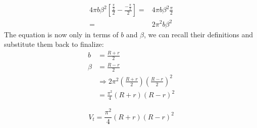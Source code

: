 \documentclass{article}
\begin{document}
	\begin{align*}
			4\pi b \beta^2\left[\frac{\frac{\pi}{2}}{2}-\frac{-\frac{\pi}{2}}{2}\right]=&4\pi b \beta^2\frac{\pi}{2} \\
			=&2\pi^2 b \beta^2
	\end{align*}
	The equation is now only in terms of  $b$ and $\beta$, we can recall their definitions and substitute them back to finalize:
	\begin{align*}
		b &= \frac{R+r}{2} \\
		\beta &=\frac{R-r}{2} \\
		&\Rightarrow 2\pi^2 \left(\frac{R+r}{2}\right) {\left(\frac{R-r}{2}\right)}^2\\
		&=\frac{\pi^2}{4}(R+r)(R-r)^2
	\end{align*}
	
	\[
	\boxed{V_t = \frac{\pi^2}{4}(R+r)(R-r)^2}
	\]
	
\end{document}
